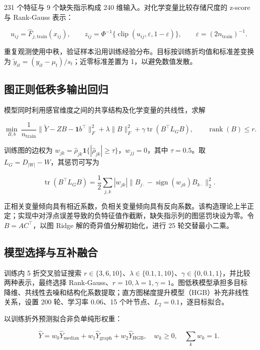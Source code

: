 \documentclass[
  chinese,
  11pt,
]{article}
\begin{document}
231 个特征与 9 个缺失指示构成 240 维输入。对化学变量比较存储尺度的
z-score 与 Rank-Gauss 表示：

\[
u_{ij}=\widehat F_{j,\mathrm{train}}(x_{ij}),\qquad
z_{ij}=\Phi^{-1}\{\operatorname{clip}(u_{ij},\varepsilon,1-\varepsilon)\},\qquad
\varepsilon=(2n_{\mathrm{train}})^{-1}.
\]

重复观测使用中秩，验证样本沿用训练经验分布。目标按训练折均值和标准差变换为
\(\widetilde y_{it}=(y_{it}-\mu_t)/s_t\)；近零标准差置为
1，以避免数值发散。

\subsection{图正则低秩多输出回归}\label{ux56feux6b63ux5219ux4f4eux79e9ux591aux8f93ux51faux56deux5f52}

模型同时利用感官维度之间的共享结构及化学变量的共线性，求解

\[
\min_{B,b}\ \frac{1}{n_{\mathrm{train}}}\|\widetilde Y-ZB-\mathbf1b^\top\|_F^2
+\lambda\|B\|_F^2+\gamma\operatorname{tr}(B^\top L_GB),\qquad \operatorname{rank}(B)\le r.
\]

训练图的边权为
\(w_{jk}=\widehat\rho_{jk}\mathbf1\{|\widehat\rho_{jk}|\ge\tau\}\)，\(w_{jj}=0\)，其中
\(\tau=0.5\)。取 \(L_G=D_{|W|}-W\)，其惩罚可写为

\[
\operatorname{tr}(B^\top L_GB)=\frac12\sum_{j,k}|w_{jk}|\|B_{j\cdot}-\operatorname{sign}(w_{jk})B_{k\cdot}\|_2^2.
\]

正相关变量倾向具有相近系数，负相关变量倾向具有反向系数。该构造理论上半正定；实现中对浮点误差导致的负特征值作截断，缺失指示列的图惩罚块设为零。令
\(B=AC^\top\)，以图 Ridge 解的奇异值分解初始化，进行 25 轮交替最小二乘。

\subsection{模型选择与互补融合}\label{ux6a21ux578bux9009ux62e9ux4e0eux4e92ux8865ux878dux5408}

训练内 5 折交叉验证搜索
\(r\in\{3,6,10\}\)、\(\lambda\in\{0.1,1,10\}\)、\(\gamma\in\{0,0.1,1\}\)，并比较两种表示，最终选择
Rank-Gauss、\(r=10,\lambda=1,\gamma=1\)。图低秩模型承担多目标降维、共线性去噪和结构化系数提取；直方图梯度提升模型（HGB）补充非线性关系，设置
200 轮、学习率 0.06、15 个叶节点、\(L_2=0.1\)，逐目标拟合。

以训练折外预测拟合非负单纯形权重：

\[
\widehat Y=w_0\widehat Y_{\mathrm{median}}+w_1\widehat Y_{\mathrm{graph}}+w_2\widehat Y_{\mathrm{HGB}},
\quad w_k\ge0,\quad\sum_kw_k=1.
\]
\end{document}
